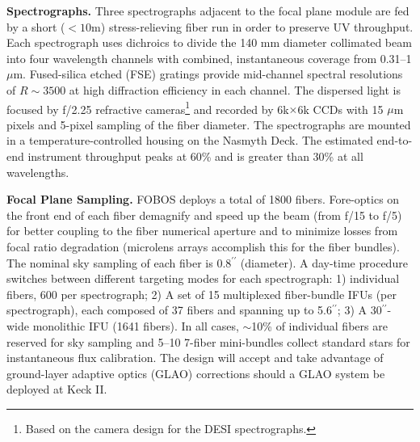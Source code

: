 \documentclass[oneside,11pt]{amsart}
\newcommand{\arcsec}{\mbox{$^{\prime\prime}$}}
\begin{document}



\noindent \textbf{Spectrographs.} Three spectrographs adjacent to the focal plane module are fed by a short ($< 10$m)
stress-relieving fiber run in order to preserve UV throughput.  Each spectrograph uses dichroics to divide the 140 mm
diameter collimated beam into four wavelength channels with combined, instantaneous coverage from 0.31--1 $\mu$m.
Fused-silica etched (FSE) gratings provide mid-channel spectral resolutions of $R \sim 3500$ at high diffraction
efficiency in each channel.  The dispersed light is focused by f/2.25 refractive cameras\footnote{Based on the camera
design for the DESI spectrographs.} and recorded by 6k$\times$6k CCDs with 15 $\mu$m pixels and 5-pixel sampling of the
fiber diameter. The spectrographs are mounted in a temperature-controlled housing on the Nasmyth Deck.  The estimated
end-to-end instrument throughput peaks at 60\% and is greater than 30\% at all wavelengths.


\noindent \textbf{Focal Plane Sampling.} FOBOS deploys a total of 1800 fibers.  Fore-optics on the front end of each fiber demagnify and speed up the beam (from f/15 to f/5) for better
coupling to the fiber numerical aperture and to minimize losses from focal ratio degradation (microlens arrays accomplish this for the fiber bundles).  The nominal sky sampling
of each fiber is 0.8\arcsec{} (diameter).  A day-time procedure switches between different targeting modes for each
spectrograph: 1) individual fibers, 600 per spectrograph; 2) A set of 15 multiplexed fiber-bundle IFUs (per
spectrograph), each composed of 37 fibers and spanning up to 5.6\arcsec{}; 3) A 30\arcsec{}-wide monolithic IFU (1641
fibers).  In all cases, $\sim$10\% of individual fibers are reserved for sky sampling and 5--10 7-fiber mini-bundles
collect standard stars for instantaneous flux calibration.  The design will accept and take advantage of ground-layer adaptive optics (GLAO) corrections should a GLAO system be deployed at Keck II.
\end{document}
